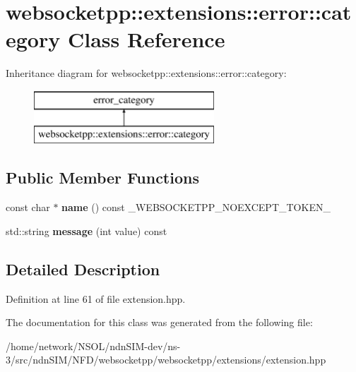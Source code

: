 \hypertarget{classwebsocketpp_1_1extensions_1_1error_1_1category}{}\section{websocketpp\+:\+:extensions\+:\+:error\+:\+:category Class Reference}
\label{classwebsocketpp_1_1extensions_1_1error_1_1category}
Inheritance diagram for websocketpp\+:\+:extensions\+:\+:error\+:\+:category\+:\begin{figure}[H]
\begin{center}
\leavevmode
\includegraphics[height=2.000000cm]{classwebsocketpp_1_1extensions_1_1error_1_1category}
\end{center}
\end{figure}
\subsection*{Public Member Functions}
\begin{DoxyCompactItemize}
\item 
const char $\ast$ {\bfseries name} () const \+\_\+\+W\+E\+B\+S\+O\+C\+K\+E\+T\+P\+P\+\_\+\+N\+O\+E\+X\+C\+E\+P\+T\+\_\+\+T\+O\+K\+E\+N\+\_\+\hypertarget{classwebsocketpp_1_1extensions_1_1error_1_1category_a862ad7d1a031d6bcfee5f654425215fd}{}\label{classwebsocketpp_1_1extensions_1_1error_1_1category_a862ad7d1a031d6bcfee5f654425215fd}

\item 
std\+::string {\bfseries message} (int value) const\hypertarget{classwebsocketpp_1_1extensions_1_1error_1_1category_a33bf4e8370bf9ba17b30e33a391788ae}{}\label{classwebsocketpp_1_1extensions_1_1error_1_1category_a33bf4e8370bf9ba17b30e33a391788ae}

\end{DoxyCompactItemize}


\subsection{Detailed Description}


Definition at line 61 of file extension.\+hpp.



The documentation for this class was generated from the following file\+:\begin{DoxyCompactItemize}
\item 
/home/network/\+N\+S\+O\+L/ndn\+S\+I\+M-\/dev/ns-\/3/src/ndn\+S\+I\+M/\+N\+F\+D/websocketpp/websocketpp/extensions/extension.\+hpp\end{DoxyCompactItemize}
